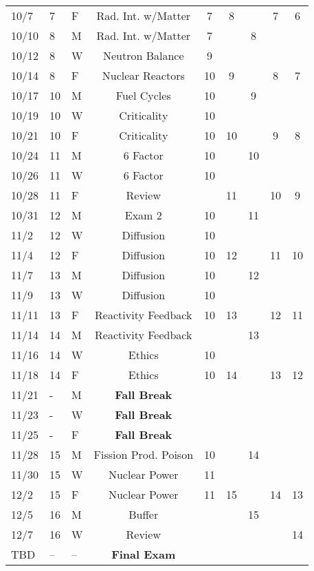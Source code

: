 \documentclass[11pt, a4paper]{article}
\begin{document}
\begin{table}[h]
\begin{center}
\begin{tabular}{lllcccccc}
10/7 & 7 & F & Rad. Int. w/Matter  & 7 & 8 &  & 7 & 6 \\
10/10 & 8 & M & Rad. Int. w/Matter     & 7 &  & 8 &  &  \\
10/12 & 8 & W & Neutron Balance         & 9 &   &  &  &  \\
10/14 & 8 & F & Nuclear Reactors        & 10 & 9 &  & 8 & 7 \\
10/17 & 10 & M & Fuel Cycles          & 10 &  & 9 &  &  \\
10/19 & 10 & W & Criticality          & 10 &  &  &  &  \\
10/21 & 10 & F & Criticality          & 10 & 10 &  & 9 & 8 \\
10/24 & 11 & M & 6 Factor            & 10 &  & 10 &  &  \\
10/26 & 11 & W & 6 Factor            & 10 &  &  &  & \\
10/28 & 11 & F & Review  &  &  11 &  & 10 & 9 \\
10/31 & 12 & M & Exam 2 &  10  &   & 11 &  &  \\
11/2 & 12 & W & Diffusion & 10  &  &  &  &  \\
11/4 & 12 & F & Diffusion & 10 & 12 &  & 11 & 10 \\
11/7 & 13 & M & Diffusion & 10 &  & 12 & &  \\
11/9 & 13 & W & Diffusion & 10 &  &  &  &  \\
11/11 & 13 & F & Reactivity Feedback    & 10 & 13 &  & 12 & 11 \\
11/14 & 14 & M & Reactivity Feedback    &  &  & 13  &  &  \\
11/16 & 14 & W & Ethics     & 10 & &  &  & \\
11/18 & 14 & F & Ethics    & 10 & 14 &  & 13 & 12 \\
11/21 & - & M & \textbf{Fall Break}&  &  &  &  &  \\
11/23 & - & W & \textbf{Fall Break}&  &  &  &  &  \\
11/25 & - & F & \textbf{Fall Break}&  &  &  &  &  \\
11/28 & 15 & M & Fission Prod. Poison    & 10  &  & 14 & &  \\
11/30 & 15 & W & Nuclear Power        & 11 &  &  &  &  \\
12/2 & 15 & F & Nuclear Power        & 11 & 15 &  & 14 & 13 \\
12/5 & 16 & M & Buffer                &  &  & 15 &  &      \\
12/7 & 16 & W &  Review               &  &  &  &  &  14 \\
TBD & -- & -- & \textbf{Final Exam}  &  &  &  &  &     \\
\end{tabular}
\end{center}
\end{table}
\FloatBarrier



\end{document}
